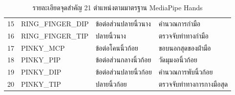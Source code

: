 \begin{table}[htbp]
\begin{tabularx}{\textwidth}{c >{\ttfamily\small}l p{4.2cm} X}
15 & RING\_FINGER\_DIP & ข้อต่อส่วนปลายนิ้วนาง & คำนวณการกำมือ \\
16 & RING\_FINGER\_TIP & ปลายนิ้วนาง & ตรวจจับท่าทางกำมือ \\
17 & PINKY\_MCP & ข้อต่อโคนนิ้วก้อย & ขอบนอกสุดของฝ่ามือ \\
18 & PINKY\_PIP & ข้อต่อส่วนกลางนิ้วก้อย & วัดมุมงอนิ้วก้อย \\
19 & PINKY\_DIP & ข้อต่อส่วนปลายนิ้วก้อย & คำนวณการพับนิ้วก้อย \\
20 & PINKY\_TIP & ปลายนิ้วก้อย & ตรวจจับท่าทางการกางมือสุด \\
\bottomrule
\end{tabularx}
\caption{รายละเอียดจุดสำคัญ 21 ตำแหน่งตามมาตรฐาน MediaPipe Hands}
\label{tab:mediapipe_landmarks}
\end{table}
